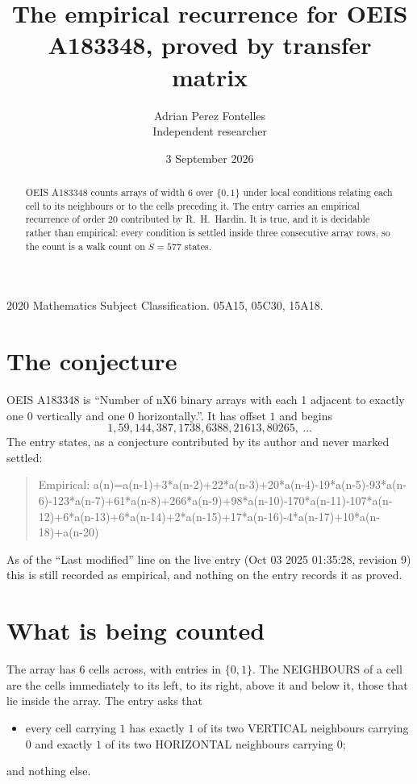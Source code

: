 \documentclass[11pt,a4paper]{article}
\title{The empirical recurrence for OEIS A183348, proved by transfer matrix}
\author{Adrian Perez Fontelles\\ \small Independent researcher}
\date{3 September 2026}
\theoremstyle{plain}
\theoremstyle{definition}
\begin{document}
\maketitle

\begin{abstract}
OEIS A183348 counts arrays of width $6$ over $\{0,1\}$ under local conditions relating each cell
to its neighbours or to the cells preceding it. The entry carries an empirical recurrence of
order $20$ contributed by R.~H.~Hardin. It is true, and it is decidable rather than
empirical: every condition is settled inside three consecutive array rows, so the count is a
walk count on $S=577$ states.
\end{abstract}

\noindent\small 2020 Mathematics Subject Classification. 05A15, 05C30, 15A18.\normalsize

\section{The conjecture}

OEIS A183348 is ``Number of nX6 binary arrays with each 1 adjacent to exactly one 0 vertically and one 0 horizontally.''. It has offset $1$ and begins
\[
1, 59, 144, 387, 1738, 6388, 21613, 80265,\ \dots
\]
The entry states, as a conjecture contributed by its author and never marked settled:
\begin{quote}
Empirical: a(n)=a(n-1)+3*a(n-2)+22*a(n-3)+20*a(n-4)-19*a(n-5)-93*a(n-6)-123*a(n-7)+61*a(n-8)+266*a(n-9)+98*a(n-10)-170*a(n-11)-107*a(n-12)+6*a(n-13)+6*a(n-14)+2*a(n-15)+17*a(n-16)-4*a(n-17)+10*a(n-18)+a(n-20)
\end{quote}
As of the ``Last modified'' line on the live entry (Oct 03 2025 01:35:28, revision 9) this is still
recorded as empirical, and nothing on the entry records it as proved.

\section{What is being counted}

The array has $6$ cells across, with entries in $\{0,1\}$. The NEIGHBOURS of a cell are the
cells immediately to its left, to its right, above it and below it, those that lie inside the
array. The entry asks that
\begin{itemize}
\item every cell carrying $1$ has exactly $1$ of its two VERTICAL neighbours carrying $0$ and exactly $1$ of its two HORIZONTAL neighbours carrying $0$;
\end{itemize}
and nothing else.
\end{document}
